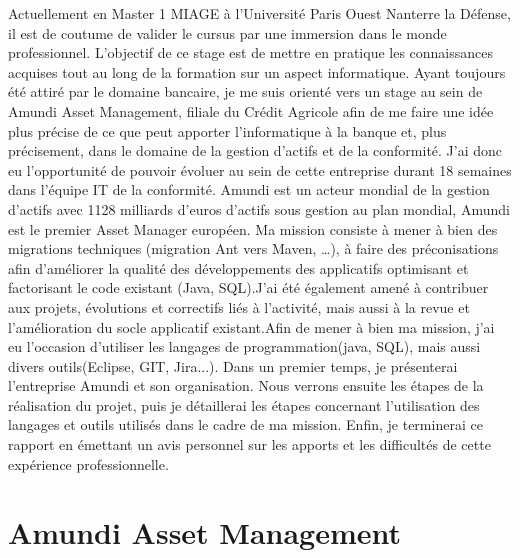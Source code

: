 \documentclass[12pt,a4paper]{report}
\begin{document}
Actuellement en Master 1 MIAGE à l’Université Paris Ouest Nanterre la Défense, il est de coutume de valider le cursus par une immersion dans le monde professionnel. L’objectif de ce stage est de mettre en pratique les connaissances acquises tout au long de la formation sur un aspect informatique.
\vspace{0.5cm}
\newline
Ayant toujours été attiré par le domaine bancaire, je me suis orienté vers un stage au sein de Amundi Asset Management, filiale du Crédit Agricole  afin de me faire une idée plus précise de ce que peut apporter l’informatique à la banque et, plus précisement, dans le domaine de la gestion d'actifs et de la conformité. J’ai donc eu l’opportunité de pouvoir évoluer au sein de cette entreprise durant 18 semaines dans l'équipe IT de la conformité.\newline
Amundi est un acteur mondial de la gestion d'actifs avec 1128 milliards d'euros d'actifs sous gestion au plan mondial, Amundi est le premier Asset Manager européen.\vspace{0.5cm} \newline
Ma mission consiste à mener à bien des migrations techniques (migration Ant vers Maven, …), à faire des préconisations afin d’améliorer la qualité des développements des applicatifs optimisant et factorisant le code existant (Java, SQL).\newline J'ai été également amené à contribuer aux projets, évolutions et correctifs liés à l'activité, mais aussi à la revue et l’amélioration du socle applicatif existant.\newline Afin de mener à bien ma mission, j'ai eu l'occasion d'utiliser les langages de programmation(java, SQL), mais aussi divers outils(Eclipse, GIT, Jira...). 
\newline
Dans un premier temps, je présenterai l’entreprise Amundi et son organisation. Nous verrons ensuite les étapes de la réalisation du projet, puis je détaillerai les étapes concernant l’utilisation des langages et outils utilisés dans le cadre de ma mission. Enfin, je terminerai ce rapport en émettant un avis personnel sur les apports et les difficultés de cette expérience professionnelle.

\newpage
\renewcommand\contentsname{Sommaire}
\tableofcontents

\newpage
\section{\textbf{ Amundi Asset Management}}
\end{document}
